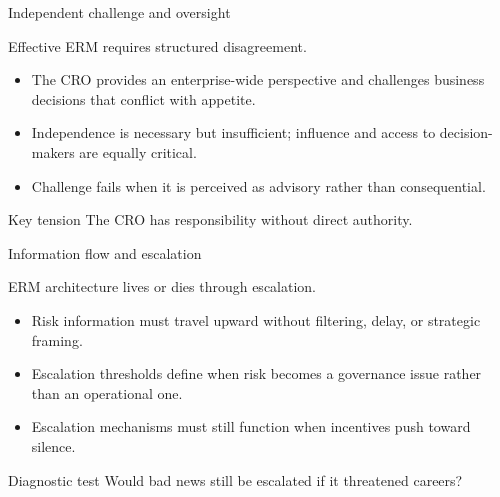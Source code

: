 \documentclass[aspectratio=169, 10pt]{beamer} %
\begin{document}
\begin{frame}{Independent challenge and oversight}

Effective ERM requires structured disagreement.

\medskip

\begin{itemize}
  \item[$\bullet$] The CRO provides an enterprise-wide perspective and challenges
  business decisions that conflict with appetite.

  \item[$\bullet$] Independence is necessary but insufficient; influence and access
  to decision-makers are equally critical.

  \item[$\bullet$] Challenge fails when it is perceived as advisory rather than
  consequential.
\end{itemize}

\begin{block}{Key tension}
The CRO has responsibility without direct authority.
\end{block}

\end{frame}

\begin{frame}{Information flow and escalation}

ERM architecture lives or dies through escalation.

\medskip

\begin{itemize}
  \item[$\bullet$] Risk information must travel upward without filtering,
  delay, or strategic framing.

  \item[$\bullet$] Escalation thresholds define when risk becomes a governance
  issue rather than an operational one.

  \item[$\bullet$] Escalation mechanisms must still function when incentives
  push toward silence.
\end{itemize}

\begin{block}{Diagnostic test}
Would bad news still be escalated if it threatened careers?
\end{block}

\end{frame}
\end{document}
